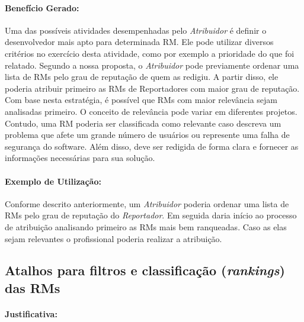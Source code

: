 \paragraph{Benefício Gerado:}\label{par:papéis_afetados_s03}

Uma das possíveis atividades desempenhadas pelo \textit{Atribuidor} é
definir o desenvolvedor mais apto para determinada RM\@. Ele pode utilizar
diversos critérios no exercício desta atividade, como por exemplo a prioridade
do que foi relatado. Segundo a nossa proposta, o \textit{Atribuidor} pode
previamente ordenar uma lista de RMs pelo grau de reputação de quem as redigiu.
A partir disso, ele poderia atribuir primeiro as RMs de Reportadores com maior
grau de reputação. Com base nesta estratégia, é possível que RMs com maior
relevância sejam analisadas primeiro. O conceito de relevância pode variar em
diferentes projetos. Contudo, uma RM poderia ser classificada como relevante
caso descreva um problema que afete um grande número de usuários ou represente
uma falha de segurança do software. Além disso, deve ser redigida de forma clara
e fornecer as informações necessárias para sua solução.

\paragraph{Exemplo de Utilização:}\label{par:exemplo_de_utilização_s03}

Conforme descrito anteriormente, um \textit{Atribuidor} poderia ordenar
uma lista de RMs pelo grau de reputação do \textit{Reportador}. Em seguida daria
início ao processo de atribuição analisando primeiro as RMs mais bem ranqueadas.
Caso as elas sejam relevantes o profissional poderia realizar a atribuição.

\subsection{Atalhos para filtros e classificação (\textit{rankings}) das RMs}\label{sub:histórico_das_ùltimas_rm_s}


\paragraph{Justificativa:}\label{par:justificativa_s04}

